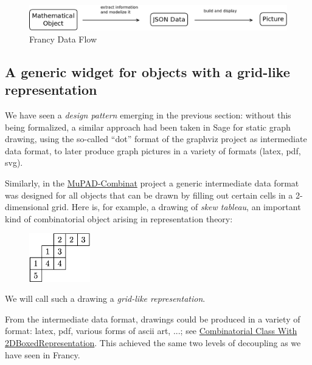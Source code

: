 \documentclass{deliverablereport}
\begin{document}
\begin{figure}[h]
  \begin{center}
    \includegraphics[width=\textwidth]{schemas/SensUnique}
  \end{center}
  \caption{Francy Data Flow}
  \label{fig:dataflow1}
\end{figure}




\subsection{A generic widget for objects with a grid-like representation}
\label{section:grid}

We have seen a \emph{design pattern} emerging in the previous section:
without this being formalized, a similar approach had been taken in
Sage for static graph drawing, using the so-called ``dot'' format of
the graphviz project as intermediate data format, to later produce
graph pictures in a variety of formats (latex, pdf, svg).

Similarly, in the
\href{http://mupad-combinat.sourceforge.net}{MuPAD-Combinat} project a
generic intermediate data format was designed for all objects that can be
drawn by filling out certain cells in a 2-dimensional grid. Here is,
for example, a drawing of \emph{skew tableau}, an important kind of
combinatorial object arising in representation theory:

\begin{figure}
    \begin{center}
      \includegraphics[width=100px]{images/JDTSlide}
\end{center}
\end{figure}
We will call such a drawing a \emph{grid-like representation}.

From the intermediate data format, drawings could be produced in a
variety of format: latex, pdf, various forms of ascii art, ...; see
\href{http://mupad-combinat.sourceforge.net/doc/en/Cat_Combinat/CombinatorialClassWith2DBoxedRepresentation.html}{Combinatorial Class With 2DBoxedRepresentation}.
This achieved the same two levels of decoupling as we have seen in Francy.
\end{document}
